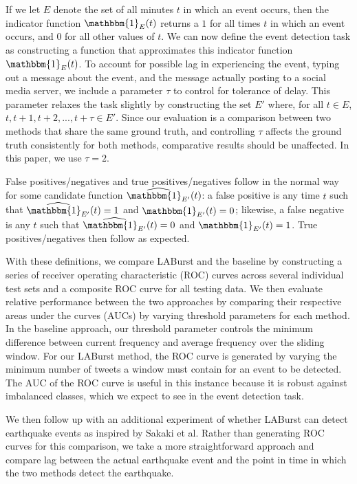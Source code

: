 \documentclass{sig-alternate}
\begin{document}
If we let $E$ denote the set of all minutes $t$ in which an event occurs, then the indicator function $\mathbbm{1}_E(t)$ returns a $1$ for all times $t$ in which an event occurs, and $0$ for all other values of $t$. 
We can now define the event detection task as constructing a function that approximates this indicator function $\mathbbm{1}_E(t)$.
To account for possible lag in experiencing the event, typing out a message about the event, and the message actually posting to a social media server, we include a parameter $\tau$ to control for tolerance of delay.
This parameter relaxes the task slightly by constructing the set $E'$ where, for all $t \in E$, $t, t+1, t+2, ..., t+\tau \in E'$.
Since our evaluation is a comparison between two methods that share the same ground truth, and controlling $\tau$ affects the ground truth consistently for both methods, comparative results should be unaffected.
In this paper, we use $\tau=2$.

False positives/negatives and true positives/negatives follow in the normal way for some candidate function $\widehat{\mathbbm{1}_{E'}}(t)$: a false positive is any time $t$ such that $\widehat{\mathbbm{1}_{E'}}(t) = 1$ and ${\mathbbm{1}_{E'}}(t) = 0$; likewise, a false negative is any $t$ such that $\widehat{\mathbbm{1}_{E'}}(t) = 0$ and ${\mathbbm{1}_{E'}}(t) = 1$.
True positives/negatives then follow as expected.

With these definitions, we compare LABurst and the baseline by constructing a series of receiver operating characteristic (ROC) curves across several individual test sets and a composite ROC curve for all testing data.
We then evaluate relative performance between the two approaches by comparing their respective areas under the curves (AUCs) by varying threshold parameters for each method.
In the baseline approach, our threshold parameter controls the minimum difference between current frequency and average frequency over the sliding window.
For our LABurst method, the ROC curve is generated by varying the minimum number of tweets a window must contain for an event to be detected.
The AUC of the ROC curve is useful in this instance because it is robust against imbalanced classes, which we expect to see in the event detection task.

We then follow up with an additional experiment of whether LABurst can detect earthquake events as inspired by Sakaki et al.
Rather than generating ROC curves for this comparison, we take a more straightforward approach and compare lag between the actual earthquake event and the point in time in which the two methods detect the earthquake.
\end{document}
